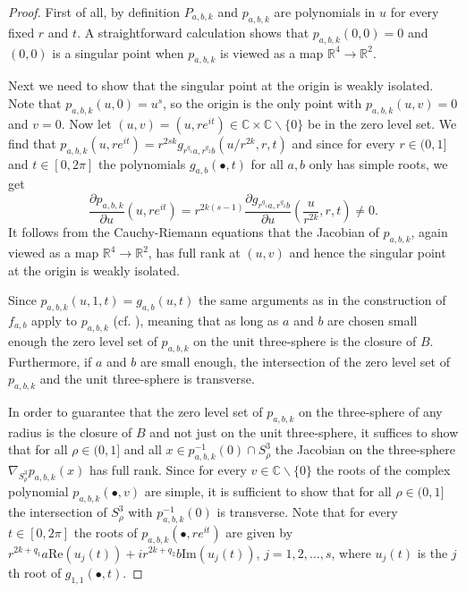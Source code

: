 \documentclass[notitlepage,12pt]{revtex4-1}
\begin{document}
\begin{proof}
First of all, by definition $P_{a,b,k}$ and $p_{a,b,k}$ are polynomials in $u$ for every fixed $r$ and $t$. A straightforward calculation shows that $p_{a,b,k}(0,0)=0$ and $(0,0)$ is a singular point when $p_{a,b,k}$ is viewed as a map $\mathbb{R}^4\to\mathbb{R}^2$. 

Next we need to show that the singular point at the origin is weakly isolated. Note that $p_{a,b,k}(u,0)=u^s$, so the origin is the only point with $p_{a,b,k}(u,v)=0$ and $v=0$. Now let $(u,v)=(u,re^{it})\in\mathbb{C}\times \mathbb{C}\backslash\{0\}$ be in the zero level set. We find that $p_{a,b,k}(u,re^{it})=r^{2sk}g_{r^{q_{1}}a,r^{q_{2}}b}(u/r^{2k},r,t)$ and since for every $r\in(0,1]$ and $t\in[0,2\pi]$ the polynomials $g_{a,b}(\bullet,t)$ for all $a,b$ only has simple roots, we get
\begin{equation}
\label{eq:simple}
\frac{\partial p_{a,b,k}}{\partial u}(u,re^{it})=r^{2k(s-1)}\frac{\partial g_{r^{q_{1}}a,r^{q_{2}}b}}{\partial u}\left(\frac{u}{r^{2k}},r,t\right)\neq 0.
\end{equation}
It follows from the Cauchy-Riemann equations that the Jacobian of $p_{a,b,k}$, again viewed as a map $\mathbb{R}^4\to\mathbb{R}^2$, has full rank at $(u,v)$ and hence the singular point at the origin is weakly isolated.

Since $p_{a,b,k}(u,1,t)=g_{a,b}(u,t)$ the same arguments as in the construction of $f_{a,b}$ apply to $p_{a,b,k}$ (cf. \cite{bode:2016polynomial}), meaning that as long as $a$ and $b$ are chosen small enough the zero level set of $p_{a,b,k}$ on the unit three-sphere is the closure of $B$. Furthermore, if $a$ and $b$ are small enough, the intersection of the zero level set of $p_{a,b,k}$ and the unit three-sphere is transverse.

In order to guarantee that the zero level set of $p_{a,b,k}$ on the three-sphere of any radius is the closure of $B$ and not just on the unit three-sphere, it suffices to show that for all $\rho\in(0,1]$ and all $x\in p_{a,b,k}^{-1}(0)\cap S^{3}_{\rho}$ the Jacobian on the three-sphere $\nabla_{S^{3}_{\rho}}p_{a,b,k}(x)$ has full rank. Since for every $v\in\mathbb{C}\backslash\{0\}$ the roots of the complex polynomial $p_{a,b,k}(\bullet,v)$ are simple, it is sufficient to show that for all $\rho\in(0,1]$ the intersection of $S^{3}_{\rho}$ with $p^{-1}_{a,b,k}(0)$ is transverse. Note that for every $t\in[0,2\pi]$ the roots of $p_{a,b,k}(\bullet,re^{it})$ are given by $r^{2k+q_{1}}a \mathrm{Re}(u_{j}(t))+ir^{2k+q_{2}}b \mathrm{Im}(u_{j}(t))$, $j=1,2,\ldots,s$, where $u_{j}(t)$ is the $j$th root of $g_{1,1}(\bullet,t)$.


\end{proof}
\end{document}
